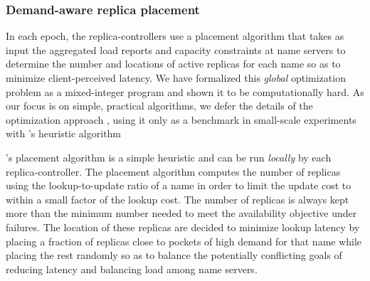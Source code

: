 \subsubsection{Demand-aware replica placement} 
\label{sec:placement}

In each epoch, the replica-controllers use a {placement algorithm} that takes as input the aggregated load reports and capacity constraints at name servers to determine the number and locations of active replicas for each name so as to minimize client-perceived latency. We have formalized this {\em global} optimization problem as a mixed-integer program and shown it to be computationally hard.  As our focus is on simple, practical algorithms, we defer the details of the optimization approach \cite{techreport}, using it only as a benchmark in small-scale experiments with \auspice's heuristic algorithm%


\auspice's placement algorithm is a simple heuristic  and can be run {\em locally} by each replica-controller. The placement algorithm computes the number of replicas using the lookup-to-update ratio of a name in order to limit the update cost to within a small factor of the lookup cost. The number of replicas is always kept more than the minimum number needed to meet the availability objective under failures.   The location of these replicas are decided to minimize lookup latency by placing a fraction of replicas close to pockets of high demand for that name while placing the rest randomly so as to balance the potentially conflicting goals of reducing latency and balancing load among name servers.


